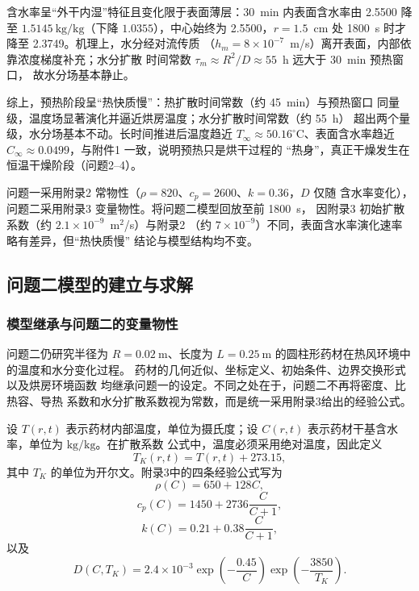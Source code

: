\documentclass[12pt,a4paper]{article}
\renewcommand{\boxed}[1]{#1}
\begin{document}
含水率呈``外干内湿''特征且变化限于表面薄层：30~min 内表面含水率由
2.5500 降至 $1.5145\ \mathrm{kg/kg}$（下降 $1.0355$），中心始终为
2.5500，$r=1.5$~cm 处 1800~s 时才降至 2.3749。机理上，水分经对流传质
（$h_m=8\times10^{-7}$~m/s）离开表面，内部依靠浓度梯度补充；水分扩散
时间常数 $\tau_m\approx R^2/D\approx55$~h 远大于 30~min 预热窗口，
故水分场基本静止。

综上，预热阶段呈``热快质慢''：热扩散时间常数（约 45~min）与预热窗口
同量级，温度场显著演化并逼近烘房温度；水分扩散时间常数（约 55~h）
超出两个量级，水分场基本不动。长时间推进后温度趋近
$T_\infty\approx50.16^\circ\mathrm{C}$、表面含水率趋近
$C_\infty\approx0.0499$，与附件1 一致，说明预热只是烘干过程的
``热身''，真正干燥发生在恒温干燥阶段（问题2--4）。

问题一采用附录2 常物性（$\rho=820$、$c_p=2600$、$k=0.36$，$D$ 仅随
含水率变化），问题二采用附录3 变量物性。将问题二模型回放至前 1800~s，
因附录3 初始扩散系数（约 $2.1\times10^{-9}$~m$^2$/s）与附录2
（约 $7\times10^{-9}$）不同，表面含水率演化速率略有差异，但``热快质慢''
结论与模型结构均不变。


\subsection{问题二模型的建立与求解}

\subsubsection{模型继承与问题二的变量物性}

问题二仍研究半径为 $R=0.02\ \mathrm{m}$、长度为
$L=0.25\ \mathrm{m}$ 的圆柱形药材在热风环境中的温度和水分变化过程。
药材的几何近似、坐标定义、初始条件、边界交换形式以及烘房环境函数
均继承问题一的设定。不同之处在于，问题二不再将密度、比热容、导热
系数和水分扩散系数视为常数，而是统一采用附录3给出的经验公式。

设 $T(r,t)$ 表示药材内部温度，单位为摄氏度；设
$C(r,t)$ 表示药材干基含水率，单位为 $\mathrm{kg/kg}$。在扩散系数
公式中，温度必须采用绝对温度，因此定义
\begin{equation}
T_K(r,t)=T(r,t)+273.15,
\end{equation}
其中 $T_K$ 的单位为开尔文。附录3中的四条经验公式写为
\begin{equation}
\boxed{
\rho(C)=650+128C
},
\end{equation}
\begin{equation}
\boxed{
c_p(C)=1450+2736\frac{C}{C+1}
},
\end{equation}
\begin{equation}
\boxed{
k(C)=0.21+0.38\frac{C}{C+1}
},
\end{equation}
以及
\begin{equation}
\boxed{
D(C,T_K)
=
2.4\times10^{-3}
\exp\left(-\frac{0.45}{C}\right)
\exp\left(-\frac{3850}{T_K}\right)
}.
\end{equation}
\end{document}
